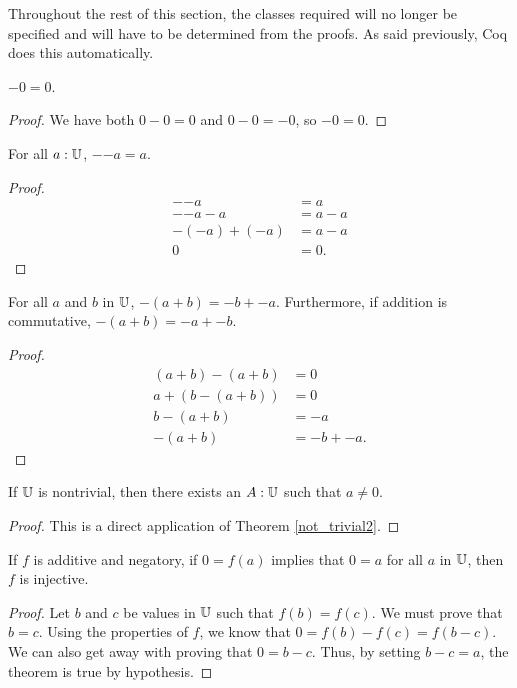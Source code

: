 \documentclass[../../math.tex]{subfiles}
\begin{document}
Throughout the rest of this section, the classes required will no longer be
specified and will have to be determined from the proofs.  As said previously,
Coq does this automatically.

\begin{theorem}
    $-0 = 0$.
\end{theorem}
\begin{proof}
    We have both $0 - 0 = 0$ and $0 - 0 = -0$, so $-0 = 0$.
\end{proof}

\begin{theorem}
    For all $a : \mathbb{U}$, $-{-a} = a$.
\end{theorem}
\begin{proof}
    \begin{align*}
        -{-a} &= a \\
        -{-a} - a &= a - a \\
        -(-a) + (-a) &= a - a \\
        0 &= 0.
    \end{align*}
\end{proof}

\begin{theorem} \label{neg_plus}
    For all $a$ and $b$ in $\mathbb{U}$, $-(a + b) = -b + -a$.  Furthermore, if addition
    is commutative, $-(a + b) = -a + -b$.
\end{theorem}
\begin{proof}
    \begin{align*}
        (a + b) - (a + b) &= 0 \\
        a + (b - (a + b)) &= 0 \\
        b - (a + b) &= -a \\
        -(a + b) &= -b + -a.
    \end{align*}
\end{proof}

\begin{theorem} \label{not_trivial_zero}
    If $\mathbb{U}$ is nontrivial, then there exists an $A : \mathbb{U}$ such that $a \neq 0$.
\end{theorem}
\begin{proof}
    This is a direct application of Theorem \ref{not_trivial2}.
\end{proof}

\begin{theorem} \label{homo_zero_inj}
    If $f$ is additive and negatory, if $0 = f(a)$ implies that $0 = a$ for all
    $a$ in $\mathbb{U}$, then $f$ is injective.
\end{theorem}
\begin{proof}
    Let $b$ and $c$ be values in $\mathbb{U}$ such that $f(b) = f(c)$.  We must prove
    that $b = c$.  Using the properties of $f$, we know that $0 = f(b) - f(c) =
    f(b - c)$.  We can also get away with proving that $0 = b - c$.  Thus, by
    setting $b - c = a$, the theorem is true by hypothesis.
\end{proof}
\end{document}
